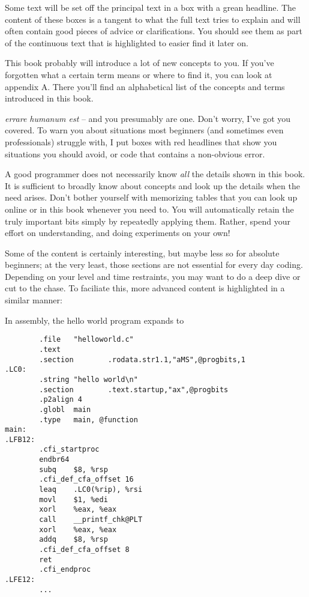 Some text will be set off the principal text in a box with a grean headline. The content of these boxes is a tangent to what the full text tries to explain and will often contain good pieces of advice or clarifications. You should see them as part of the continuous text that is highlighted to easier find it later on.

\begin{hintbox}
This book probably will introduce a lot of new concepts to you. If you've forgotten what a certain term means or where to find it, you can look at appendix A. There you'll find an alphabetical list of the concepts and terms introduced in this book.
\end{hintbox}

\emph{errare humanum est} -- and you presumably are one. Don't worry, I've got you covered. To warn you about situations most beginners (and sometimes even professionals) struggle with, I put boxes with red headlines that show you situations you should avoid, or code that contains a non-obvious error.

\begin{warnbox}
A good programmer does not necessarily know \emph{all} the details shown in this book. It is sufficient to broadly know about concepts and look up the details when the need arises. Don't bother yourself with memorizing tables that you can look up online or in this book whenever you need to. You will automatically retain the truly important bits simply by repeatedly applying them. Rather, spend your effort on understanding, and doing experiments on your own!
\end{warnbox}

Some of the content is certainly interesting, but maybe less so for absolute beginners; at the very least, those sections are not essential for every day coding. Depending on your level and time restraints, you may want to do a deep dive or cut to the chase. To faciliate this, more advanced content is highlighted in a similar manner:
\begin{plusbox}
In assembly, the hello world program expands to
\begin{codebox}[helloworld.s]
\begin{verbatim}
        .file   "helloworld.c"
        .text
        .section        .rodata.str1.1,"aMS",@progbits,1
.LC0:
        .string "hello world\n"
        .section        .text.startup,"ax",@progbits
        .p2align 4
        .globl  main
        .type   main, @function
main:
.LFB12:
        .cfi_startproc
        endbr64
        subq    $8, %rsp
        .cfi_def_cfa_offset 16
        leaq    .LC0(%rip), %rsi
        movl    $1, %edi
        xorl    %eax, %eax
        call    __printf_chk@PLT
        xorl    %eax, %eax
        addq    $8, %rsp
        .cfi_def_cfa_offset 8
        ret
        .cfi_endproc
.LFE12:
        ...
\end{verbatim}
\end{codebox}
\end{plusbox}

